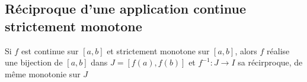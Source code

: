 \documentclass[french]{yLectureNote}
\newcommand{\Lim}[1]{\lim\limits_{\substack{#1}}\:}
\begin{document}
%
%
%
%
%
%
%
%
%

\subsection{Réciproque d'une application continue strictement monotone}

\begin{theorem}[]
Si $f$ est continue sur $[a,b]$ et strictement monotone sur $[a,b]$, alors $f$  réalise une bijection de $[a,b]$ dans $J=[f(a),f(b)]$ et $f^{-1} : J\to I$ sa récirproque, de m\^eme monotonie sur $J$
\end{theorem}
\end{document}
